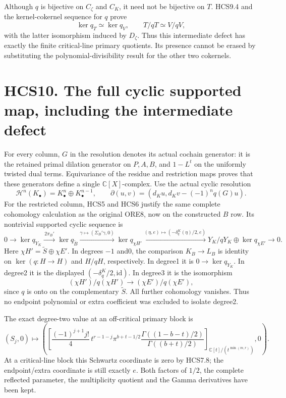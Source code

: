 Although \(q\) is bijective on \(C_\zeta\) and \(C_K\), it need not be
bijective on \(T\). HCS9.4 and the kernel-cokernel sequence for \(q\)
prove \[
\ker q_T\simeq\ker q_V,\qquad T/qT\simeq V/qV,
\tag{HCS9.7}
\] with the latter isomorphism induced by \(D_\zeta\). Thus this
intermediate defect has exactly the finite critical-line primary
quotients. Its presence cannot be erased by substituting the
polynomial-divisibility result for the other two cokernels.

\section{HCS10. The full cyclic supported map, including the
intermediate
defect}\label{hcs10.-the-full-cyclic-supported-map-including-the-intermediate-defect}

For every column, \(G\) in the resolution denotes its actual cochain
generator: it is the retained primal dilation generator on \(P,A,B\),
and \(1-L^t\) on the uniformly twisted dual terms. Equivariance of the
residue and restriction maps proves that these generators define a
single \(\mathbb C[X]\)-complex. Use the actual cyclic resolution \[
\mathscr H^n(K_\bullet)=K_\bullet^n\oplus K_\bullet^{n-1},
\qquad
\partial(u,v)=(d_Ku,d_Kv-(-1)^nq(G)u).
\tag{HCS10.1}
\] For the restricted column, HCS5 and HCS6 justify the same complete
cohomology calculation as the original ORE8, now on the constructed
\(B\) row. Its nontrivial supported cyclic sequence is \[
\boxed{
0\to\ker q_{Y_K}\xrightarrow{\,2\pi_B'\,}
\ker q_{\widetilde B}\xrightarrow{\gamma\mapsto(\Sigma_B'\gamma,0)}
\ker q_{\chi H'}
\xrightarrow{(\eta,e)\mapsto(-\delta_q^K(\eta)/2,e)}
Y_K/qY_K\oplus\ker q_{\chi E'}\to0.}
\tag{HCS10.2}
\] Here \(\chi H'=\widetilde S\oplus\chi E'\). In degrees \(-1\) and0,
the comparison \(K_B\to L_B\) is identity on \(\ker(q:H\to H)\) and
\(H/qH\), respectively. In degree1 it is \(0\to\ker q_{Y_K}\). In
degree2 it is the displayed \((-\delta_q^K/2,\mathrm{id})\). In degree3
it is the isomorphism \[
(\chi H')/q(\chi H')\to(\chi E')/q(\chi E'),
\tag{HCS10.3}
\] since \(q\) is onto on the complementary \(\widetilde S\). All
further cohomology vanishes. Thus no endpoint polynomial or extra
coefficient was excluded to isolate degree2.

The exact degree-two value at an off-critical primary block is \[
\boxed{
(S_j,0)\longmapsto
\left(
\left[\frac{(-1)^{j+1}j!}{4}\,
t^{r-1-j}\pi^{b+t-1/2}
\frac{\Gamma((1-b-t)/2)}{\Gamma((b+t)/2)}
\right]_{\mathbb C[t]/(t^{\min(m,r)})},
0\right).}
\tag{HCS10.4}
\] At a critical-line block this Schwartz coordinate is zero by HCS7.8;
the endpoint/extra coordinate is still exactly \(e\). Both factors of
\(1/2\), the complete reflected parameter, the multiplicity quotient and
the Gamma derivatives have been kept.

